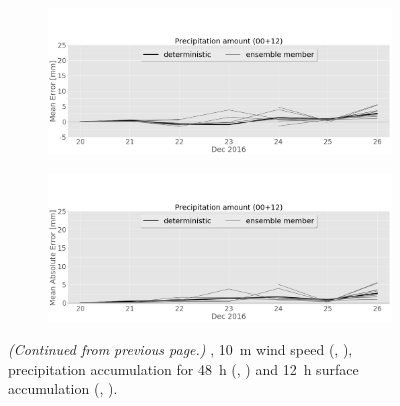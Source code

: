 \begin{figure}
\begin{subfigure}[b]{0.49\textwidth}
			\caption{}\label{fig:MAE:precip}
		\end{subfigure}
        \begin{subfigure}[b]{0.49\textwidth}
			\includegraphics[width=\textwidth]{./fig_sfc_precip/ME12_20161220_26_00}
			\caption{}\label{fig:bias:precip12}
		\end{subfigure}
        \begin{subfigure}[b]{0.49\textwidth}
			\includegraphics[width=\textwidth]{./fig_sfc_precip/MAE12_20161220_26_00}
			\caption{}\label{fig:MAE:precip12}
		\end{subfigure}
	\caption{\textit{(Continued from previous page.)} ,  \SI{10}{\metre} wind speed (\protect{}, \protect{}), precipitation accumulation for \SI{48}{\hour} (\protect{}, \protect{}) and \SI{12}{\hour} surface accumulation (\protect{}, \protect{}). }    
\end{figure}
